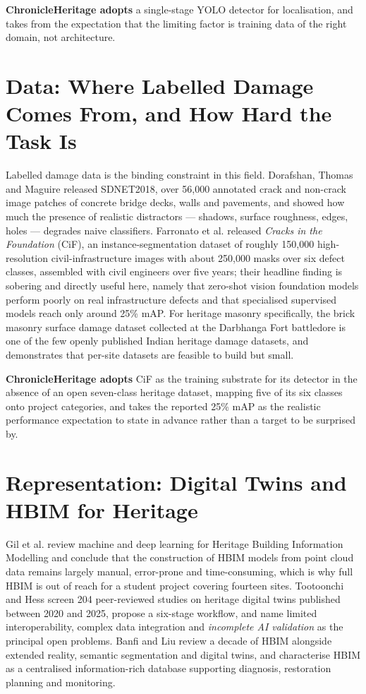 \documentclass[a4paper,12pt,oneside]{book}
\begin{document}
\textbf{ChronicleHeritage adopts} a single-stage YOLO detector for localisation, and takes from \cite{cha2017deep} the expectation that the limiting factor is training data of the right domain, not architecture.

\section{Data: Where Labelled Damage Comes From, and How Hard the Task Is}
Labelled damage data is the binding constraint in this field. Dorafshan, Thomas and Maguire \cite{dorafshan2018sdnet} released SDNET2018, over 56{,}000 annotated crack and non-crack image patches of concrete bridge decks, walls and pavements, and showed how much the presence of realistic distractors --- shadows, surface roughness, edges, holes --- degrades naive classifiers. Farronato et al. \cite{farronato2026cif} released \textit{Cracks in the Foundation} (CiF), an instance-segmentation dataset of roughly 150{,}000 high-resolution civil-infrastructure images with about 250{,}000 masks over six defect classes, assembled with civil engineers over five years; their headline finding is sobering and directly useful here, namely that zero-shot vision foundation models perform poorly on real infrastructure defects and that specialised supervised models reach only around 25\% mAP. For heritage masonry specifically, the brick masonry surface damage dataset collected at the Darbhanga Fort battledore \cite{darbhanga2025dataset} is one of the few openly published Indian heritage damage datasets, and demonstrates that per-site datasets are feasible to build but small.

\textbf{ChronicleHeritage adopts} CiF as the training substrate for its detector in the absence of an open seven-class heritage dataset, mapping five of its six classes onto project categories, and takes the reported 25\% mAP as the realistic performance expectation to state in advance rather than a target to be surprised by.

\section{Representation: Digital Twins and HBIM for Heritage}
Gil et al. \cite{gil2024hbim} review machine and deep learning for Heritage Building Information Modelling and conclude that the construction of HBIM models from point cloud data remains largely manual, error-prone and time-consuming, which is why full HBIM is out of reach for a student project covering fourteen sites. Tootoonchi and Hess \cite{tootoonchi2026dt} screen 204 peer-reviewed studies on heritage digital twins published between 2020 and 2025, propose a six-stage workflow, and name limited interoperability, complex data integration and \textit{incomplete AI validation} as the principal open problems. Banfi and Liu \cite{banfi2026hbim} review a decade of HBIM alongside extended reality, semantic segmentation and digital twins, and characterise HBIM as a centralised information-rich database supporting diagnosis, restoration planning and monitoring.
\end{document}
